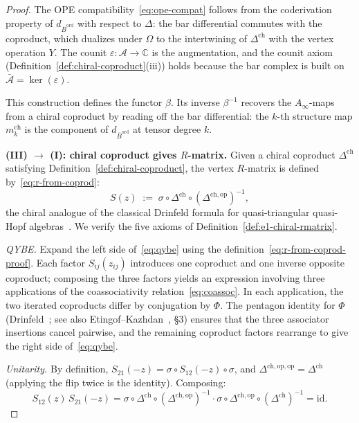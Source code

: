 \documentclass[11pt,reqno]{amsart}
\theoremstyle{definition}
\theoremstyle{remark}
\newcommand{\cA}{\mathcal{A}}
\newcommand{\Ainf}{A_{\infty}}
\newcommand{\Barord}{\overline{B}^{\mathrm{ord}}}
\newcommand{\CC}{\mathbb{C}}
\newcommand{\id}{\mathrm{id}}
\newcommand{\op}{\mathrm{op}}
\numberwithin{equation}{section}
\begin{document}
\begin{proof}
The OPE compatibility~\eqref{eq:ope-compat} follows from
the coderivation property of $d_{\Barord}$ with respect
to $\Delta$: the bar differential commutes with the
coproduct, which dualizes under $\Omega$ to the
intertwining of $\Delta^{\mathrm{ch}}$ with the vertex
operation $Y$. The counit
$\varepsilon \colon \cA \to \CC$ is the augmentation, and
the counit axiom
(Definition~\ref{def:chiral-coproduct}(iii)) holds because
the bar complex is built on
$\bar{\cA} = \ker(\varepsilon)$.

This construction defines the functor $\beta$. Its
inverse $\beta^{-1}$ recovers the $\Ainf$-maps from a
chiral coproduct by reading off the bar differential: the
$k$-th structure map $m_k^{\mathrm{ch}}$ is the component
of $d_{\Barord}$ at tensor degree $k$.

\medskip
\noindent
\textbf{(III) $\boldsymbol{\to}$ (I): chiral coproduct
gives $R$-matrix.}
Given a chiral coproduct $\Delta^{\mathrm{ch}}$ satisfying
Definition~\ref{def:chiral-coproduct}, the vertex
$R$-matrix is defined by~\eqref{eq:r-from-coprod}:
\begin{equation}\label{eq:r-from-coprod-proof}
  S(z)
  \;:=\; \sigma \circ \Delta^{\mathrm{ch}}
  \circ (\Delta^{\mathrm{ch},\op})^{-1},
\end{equation}
the chiral analogue of the classical Drinfeld formula for
quasi-triangular quasi-Hopf
algebras~\cite{Drinfeld90}.
We verify the five axioms of
Definition~\ref{def:e1-chiral-rmatrix}.

\emph{QYBE.}
Expand the left side of~\eqref{eq:qybe} using the
definition~\eqref{eq:r-from-coprod-proof}. Each factor
$S_{ij}(z_{ij})$ introduces one coproduct and one
inverse opposite coproduct; composing the three factors
yields an expression involving three applications of the
coassociativity relation~\eqref{eq:coassoc}. In each
application, the two iterated coproducts differ by
conjugation by $\Phi$. The pentagon identity for $\Phi$
(Drinfeld~\cite{Drinfeld90}; see also
Etingof--Kazhdan~\cite{EK96}, \S3) ensures that the
three associator insertions cancel pairwise, and the
remaining coproduct factors rearrange to give the right
side of~\eqref{eq:qybe}.

\emph{Unitarity.}
By definition, $S_{21}(-z) = \sigma \circ S_{12}(-z)
\circ \sigma$, and
$\Delta^{\mathrm{ch},\op,\op} = \Delta^{\mathrm{ch}}$
(applying the flip twice is the identity). Composing:
\[
  S_{12}(z)\, S_{21}(-z)
  = \sigma \circ \Delta^{\mathrm{ch}} \circ
  (\Delta^{\mathrm{ch},\op})^{-1}
  \cdot
  \sigma \circ \Delta^{\mathrm{ch},\op} \circ
  (\Delta^{\mathrm{ch}})^{-1}
  = \id.
\]


\end{proof}
\end{document}
